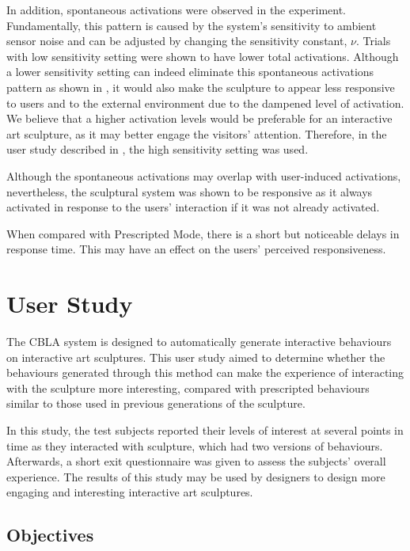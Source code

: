 In addition, spontaneous activations were observed in the experiment. Fundamentally, this pattern is caused by the system's sensitivity to ambient sensor noise and can be adjusted by changing the sensitivity constant, $\nu$. Trials with low sensitivity setting were shown to have lower total activations. Although a lower sensitivity setting can indeed eliminate this spontaneous activations pattern as shown in , it would also make the sculpture to appear less responsive to users and to the external environment due to the dampened level of activation. We believe that a higher activation levels would be preferable for an interactive art sculpture, as it may better engage the visitors' attention. Therefore, in the user study described in , the high sensitivity setting was used.

Although the spontaneous activations may overlap with user-induced activations, nevertheless, the sculptural system was shown to be responsive as it always activated in response to the users' interaction if it was not already activated.

When compared with Prescripted Mode, there is a short but noticeable delays in response time. This may have an effect on the users' perceived responsiveness.

\FloatBarrier
\section{User Study}\label{sec:user-study}

The CBLA system is designed to automatically generate interactive behaviours on interactive art sculptures. This user study aimed to determine whether the behaviours generated through this method can make the experience of interacting with the sculpture more interesting, compared with prescripted behaviours similar to those used in previous generations of the sculpture.

In this study, the test subjects reported their levels of interest at several points in time as they interacted with sculpture, which had two versions of behaviours. Afterwards, a short exit questionnaire was given to assess the subjects' overall experience. The results of this study may be used by designers to design more engaging and interesting interactive art sculptures. 

\subsection{Objectives}\label{sec:user-study-objectives}

